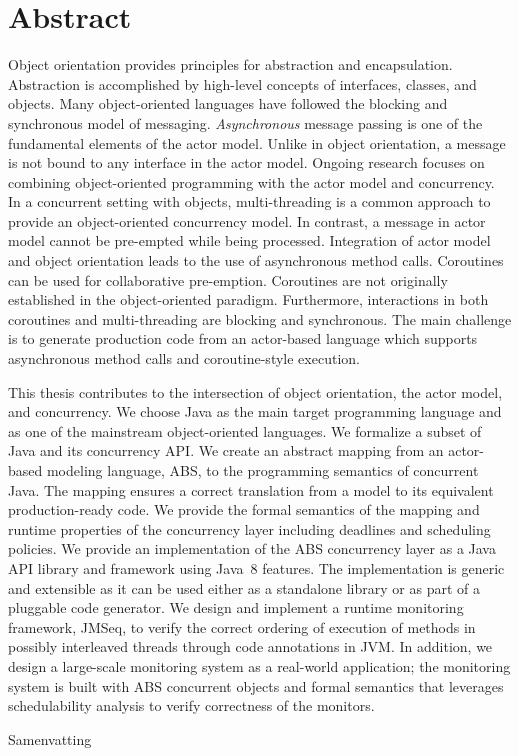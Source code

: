 %
\chapter*{Abstract}
\label{sec:abstract}
\vspace*{-10mm}

Object orientation provides principles for abstraction and encapsulation.
Abstraction is accomplished by high-level concepts of interfaces, classes, and objects.
Many object-oriented languages have followed the blocking and synchronous model of messaging. 
\emph{Asynchronous} message passing is one of the fundamental elements of the actor model.
Unlike in object orientation, a message is not bound to any interface in the actor model.
Ongoing research focuses on combining object-oriented programming with the actor model and concurrency.
In a concurrent setting with objects, multi-threading is a common approach to provide an object-oriented concurrency model.
In contrast, a message in actor model cannot be pre-empted while being processed.
Integration of actor model and object orientation leads to the use of asynchronous method calls.
Coroutines can be used for collaborative pre-emption.
Coroutines are not originally established in the object-oriented paradigm.
Furthermore, interactions in both coroutines and multi-threading are blocking and synchronous.
The main challenge is to generate production code from an actor-based language which supports asynchronous method calls and coroutine-style execution.

This thesis contributes to the intersection of object orientation, the actor model, and concurrency.
We choose Java as the main target programming language and as one of the mainstream 
object-oriented languages. 
We formalize a subset of Java and its concurrency API.
We create an abstract mapping from an actor-based modeling language, ABS, to the programming semantics of concurrent Java. 
The mapping ensures a correct translation from a model to its equivalent production-ready code.
We provide the formal semantics of the mapping and runtime properties of 
the concurrency layer including deadlines and scheduling policies.
We provide an implementation of the ABS concurrency layer as a Java API library and framework using Java~8 features.
The implementation is generic and extensible as it can be used either as a standalone library or as part of a pluggable code generator.
We design and implement a runtime monitoring framework, JMSeq, to verify the
correct ordering of execution of methods in possibly interleaved threads through code annotations in JVM. 
In addition, we design a large-scale monitoring system as a real-world 
application; the monitoring system is built with ABS concurrent objects 
and formal semantics that leverages schedulability analysis to verify correctness of the monitors.

\vspace*{20mm}

{Samenvatting}\label{sec:abstract-diff} \\

